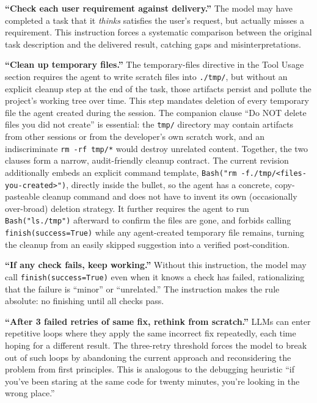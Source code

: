 \documentclass{article}
\begin{document}
\textbf{``Check each user requirement against delivery.''}  The model may have completed a task that it \emph{thinks} satisfies the user's request, but actually misses a requirement.  This instruction forces a systematic comparison between the original task description and the delivered result, catching gaps and misinterpretations.

\textbf{``Clean up temporary files.''}  The temporary-files directive in the Tool Usage section requires the agent to write scratch files into \texttt{./tmp/}, but without an explicit cleanup step at the end of the task, those artifacts persist and pollute the project's working tree over time.  This step mandates deletion of every temporary file the agent created during the session.  The companion clause ``Do NOT delete files you did not create'' is essential: the \texttt{tmp/} directory may contain artifacts from other sessions or from the developer's own scratch work, and an indiscriminate \texttt{rm -rf tmp/*} would destroy unrelated content.  Together, the two clauses form a narrow, audit-friendly cleanup contract.  The current revision additionally embeds an explicit command template, \texttt{Bash("rm -f./tmp/<files-you-created>")}, directly inside the bullet, so the agent has a concrete, copy-pasteable cleanup command and does not have to invent its own (occasionally over-broad) deletion strategy.  It further requires the agent to run \texttt{Bash("ls./tmp")} afterward to confirm the files are gone, and forbids calling \texttt{finish(success=True)} while any agent-created temporary file remains, turning the cleanup from an easily skipped suggestion into a verified post-condition.

\textbf{``If any check fails, keep working.''}  Without this instruction, the model may call \texttt{finish(success=True)} even when it knows a check has failed, rationalizing that the failure is ``minor'' or ``unrelated.''  The instruction makes the rule absolute: no finishing until all checks pass.

\textbf{``After 3 failed retries of same fix, rethink from scratch.''}  LLMs can enter repetitive loops where they apply the same incorrect fix repeatedly, each time hoping for a different result.  The three-retry threshold forces the model to break out of such loops by abandoning the current approach and reconsidering the problem from first principles.  This is analogous to the debugging heuristic ``if you've been staring at the same code for twenty minutes, you're looking in the wrong place.''
\end{document}
